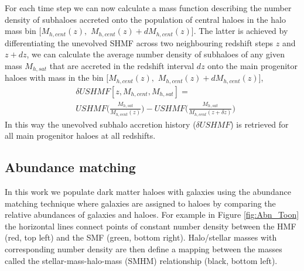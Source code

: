 For each time step we can now calculate a mass function describing the number density of subhaloes accreted onto the population of central haloes in the halo mass bin $[M_{h,cent}(z),$ $M_{h,cent}(z) + dM_{h,cent}(z)]$. The latter is achieved by differentiating the unevolved SHMF across two neighbouring redshift steps $z$ and $z+dz$, we can calculate the average number density of subhaloes of any given mass $M_{h, sat}$ that are accreted in the redshift interval $dz$ onto the main progenitor haloes with mass in the bin $[M_{h,cent}(z),$ $M_{h,cent}(z) + dM_{h,cent}(z)]$,
\begin{equation}
\label{eqn:deltSHMF}
\begin{split}
&\delta USHMF[z, M_{h,cent},M_{h,sat}] =  \\
&USHMF\Big(\frac{M_{h,sat}}{M_{h,cent}(z)}\Big) - USHMF\Big(\frac{M_{h,sat}}{M_{h,cent}(z + \delta z)}\Big)
\end{split}
\end{equation}
In this way the unevolved subhalo accretion history ($\delta USHMF$) is retrieved for all main progenitor haloes at all redshifts.


\subsection{Abundance matching}
\label{C2:SubSec:AbnMtch}
In this work we populate dark matter haloes with galaxies using the abundance matching technique where galaxies are assigned to haloes by comparing the relative abundances of galaxies and haloes. For example in Figure \ref{fig:Abn_Toon} the horizontal lines connect points of constant number density between the HMF (red, top left) and the SMF (green, bottom right). Halo/stellar masses with corresponding number density are then define a mapping between the masses called the stellar-mass-halo-mass (SMHM) relationship (black, bottom left).

